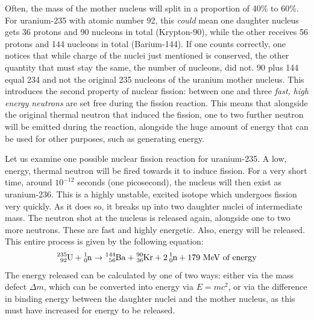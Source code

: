Often, the mass of the mother nucleus will split in a proportion of 40\% to 60\%. For uranium-235 with atomic number 92, this \emph{could} mean one daughter nucleus gets 36 protons and 90 nucleons in total (Krypton-90), while the other receives 56 protons and 144 nucleons in total (Barium-144). If one counts correctly, one notices that while charge of the nuclei just mentioned is conserved, the other quantity that must stay the same, the number of nucleons, did not. 90 plus 144 equal 234 and not the original 235 nucleons of the uranium mother nucleus. This introduces the second property of nuclear fission: between one and three \emph{fast, high energy neutrons} are set free during the fission reaction. This means that alongside the original thermal neutron that induced the fission, one to two further neutron will be emitted during the reaction, alongside the huge amount of energy that can be used for other purposes, such as generating energy.

Let us examine one possible nuclear fission reaction for uranium-235. A low, energy, thermal neutron will be fired towards it to induce fission. For a very short time, around $10^{-12}$ seconds (one picosecond), the nucleus will then exist as uranium-236. This is a highly unstable, excited isotope which undergoes fission very quickly. As it does so, it breaks up into two daughter nuclei of intermediate mass. The neutron shot at the nucleus is released again, alongside one to two more neutrons. These are fast and highly energetic. Also, energy will be released. This entire process is given by the following equation: $$\ce{^{235}_{92}U} + \ce{^1_0n} \rightarrow \ce{^{144}_{56}Ba} + \ce{^{90}_{36}Kr} + 2\, \ce{^1_0n} + 179 \text{ MeV of energy}$$ The energy released can be calculated by one of two ways: either via the mass defect $\Delta m$, which can be converted into energy via $E=mc^2$, or via the difference in binding energy between the daughter nuclei and the mother nucleus, as this must have increased for energy to be released.

